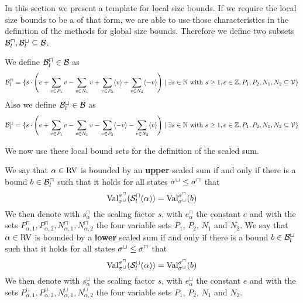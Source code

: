 In this section we present a template for local size bounds.
If we require the local size bounds to be a of that form, we are able to use those characteristics in the definition of the methods for global size bounds.
Therefore we define two subsets $\mathcal{B}^\sqcap_l, \mathcal{B}^\sqcup_l \subseteq \mathcal{B}$.

\begin{definition}
  We define $\mathcal{B}^\sqcap_l \in \mathcal{B}$ as 
  \[ \mathcal{B}^\sqcap_l = \lbrace 
    s \cdot \left(
        e
      + \sum_{v \in P_1} v
      - \sum_{v \in N_1} v
      + \sum_{v \in P_2} \langle v\rangle
      + \sum_{v \in N_2} \langle-v\rangle
      \right) \mid \exists s \in \mathbb{N} \text{ with } s \geq 1, e \in \mathbb{Z}, P_1, P_2, N_1, N_2 \subseteq \mathcal{V}  \rbrace\]
  Also we define $\mathcal{B}^\sqcup_l \in \mathcal{B}$ as 
  \[ \mathcal{B}^\sqcup_l = \lbrace 
    s \cdot \left(
        e
      + \sum_{v \in P_1} v
      - \sum_{v \in N_1} v
      - \sum_{v \in P_2} \langle-v\rangle
      - \sum_{v \in N_2} \langle v\rangle
      \right) \mid \exists s \in \mathbb{N} \text{ with } s \geq 1, e \in \mathbb{Z}, P_1, P_2, N_1, N_2 \subseteq \mathcal{V}  \rbrace\]
\end{definition}

We now use these local bound sets for the definition of the scaled sum.

\begin{definition}
  We say that $\alpha \in \text{RV}$ is bounded by an \textbf{upper} scaled sum if and only if there is a bound $b \in \mathcal{B}^\sqcap_l$ such that it holds for all states ${\sigma^\sqcup} \leq {\sigma^\sqcap}$ that
  \[ \text{Val}_{{\sigma^\sqcup}}^{{\sigma^\sqcap}}({\mathcal{S}^\sqcap_l}(\alpha)) = \text{Val}_{{\sigma^\sqcup}}^{{\sigma^\sqcap}}(b) \]
  We then denote with $s^\sqcap_\alpha$ the scaling factor $s$, with $e^\sqcap_\alpha$ the constant $e$ and with the sets $P_{\alpha,1}^\sqcap, P_{\alpha,2}^\sqcap, N_{\alpha,1}^\sqcap, N_{\alpha,2}^\sqcap$ the four variable sets $P_1$, $P_2$, $N_1$ and $N_2$.
  We say that $\alpha \in \text{RV}$ is bounded by a \textbf{lower} scaled sum if and only if there is a bound $b \in \mathcal{B}^\sqcup_l$ such that it holds for all states ${\sigma^\sqcup} \leq {\sigma^\sqcap}$ that
  \[ \text{Val}_{{\sigma^\sqcup}}^{{\sigma^\sqcap}}({\mathcal{S}^\sqcup_l}(\alpha)) = \text{Val}_{{\sigma^\sqcup}}^{{\sigma^\sqcap}}(b) \]
  We then denote with $s^\sqcup_\alpha$ the scaling factor $s$, with $e^\sqcup_\alpha$ the constant $e$ and with the sets $P_{\alpha,1}^\sqcup, P_{\alpha,2}^\sqcup, N_{\alpha,1}^\sqcup, N_{\alpha,2}^\sqcup$ the four variable sets $P_1$, $P_2$, $N_1$ and $N_2$.
\end{definition}

